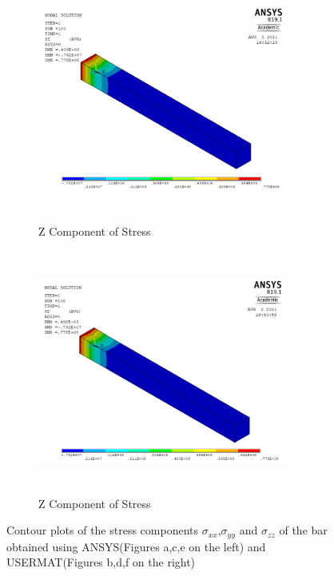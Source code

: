 \documentclass[a4paper,12pt,twoside]{report}
\begin{document}
\begin{figure}[htbp!]\ContinuedFloat     
     \begin{subfigure}[b]{0.4\textwidth}
         \includegraphics[width=8.3cm,height=8cm,keepaspectratio]{17.Ansys_SZ.png}
         \caption{Z Component of Stress}
         \label{fig:Z Component of Stress}
     \end{subfigure}
     \hspace{1.8cm}
     \begin{subfigure}[b]{0.4\textwidth}
         \includegraphics[width=8.3cm,height=8cm,keepaspectratio]{20.User_SZ.png}
         \caption{Z Component of Stress}
         \label{fig:Z Component of Stress2}
     \end{subfigure}
        \caption{Contour plots of the stress components $\sigma_{xx}$,$\sigma_{yy}$ and $\sigma_{zz}$ of the bar obtained using ANSYS(Figures a,c,e on the left) and USERMAT(Figures b,d,f on the right)}
        \label{fig:USERMAT}     
\end{figure}
\FloatBarrier
\end{document}
